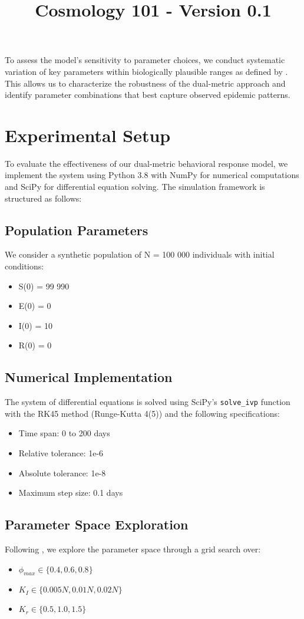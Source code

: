 \documentclass{article}\usepackage{graphicx} \usepackage{amsmath} \usepackage{colortbl}\title{Cosmology 101 - Version 0.1}
\begin{document}
To assess the model's sensitivity to parameter choices, we conduct systematic variation of key parameters within biologically plausible ranges as defined by \cite{verelst2016behavioural}. This allows us to characterize the robustness of the dual-metric approach and identify parameter combinations that best capture observed epidemic patterns.\section{Experimental Setup}
To evaluate the effectiveness of our dual-metric behavioral response model, we implement the system using Python 3.8 with NumPy for numerical computations and SciPy for differential equation solving. The simulation framework is structured as follows:

\subsection{Population Parameters}
We consider a synthetic population of N = 100 000 individuals with initial conditions:
\begin{itemize}
\item S(0) = 99 990
\item E(0) = 0
\item I(0) = 10
\item R(0) = 0
\end{itemize}

\subsection{Numerical Implementation}
The system of differential equations is solved using SciPy's \texttt{solve\_ivp} function with the RK45 method (Runge-Kutta 4(5)) and the following specifications:
\begin{itemize}
\item Time span: 0 to 200 days
\item Relative tolerance: 1e-6
\item Absolute tolerance: 1e-8
\item Maximum step size: 0.1 days
\end{itemize}

\subsection{Parameter Space Exploration}
Following \cite{funk2010modelling}, we explore the parameter space through a grid search over:
\begin{itemize}
\item $\phi_{max} \in \{0.4, 0.6, 0.8\}$
\item $K_I \in \{0.005N, 0.01N, 0.02N\}$
\item $K_r \in \{0.5, 1.0, 1.5\}$
\end{itemize}
\end{document}
